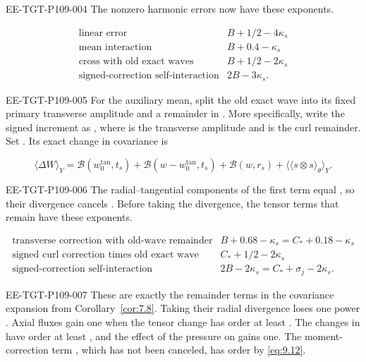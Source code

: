 \begin{EESegment}{EE-TGT-P109-004}
The nonzero harmonic errors now have these exponents.
\end{EESegment}
\[
\begin{array}{r|l}
\text{linear error} & B+1/2-4\kappa_s\\
\text{mean interaction} & B+0.4-\kappa_s\\
\text{cross with old exact waves} & B+1/2-2\kappa_s\\
\text{signed-correction self-interaction} & 2B-3\kappa_s.
\end{array}
\]
\begin{EESegment}{EE-TGT-P109-005}
For the auxiliary mean, split the old exact wave into its fixed primary transverse amplitude and a
remainder in . More specifically, write the signed increment
as , where  is the transverse amplitude
and  is the curl remainder. Set
.
Its exact change in covariance is
\end{EESegment}
\begin{equation}
\langle\Delta W\rangle_Y
=\mathscr B(w_0^{\tan},t_s)+\mathscr B(w-w_0^{\tan},t_s)
 +\mathscr B(w,r_s)+\langle\langle s\otimes s\rangle_\theta\rangle_Y.
\tag{9.13}\label{eq:9.13}
\end{equation}
\begin{EESegment}{EE-TGT-P109-006}
The radial--tangential components of the first term equal
, so their divergence cancels
. Before taking the divergence, the tensor terms that remain have
these exponents.
\end{EESegment}
\[
\begin{array}{r|l}
\text{transverse correction with old-wave remainder}
  & B+0.68-\kappa_s=C_*+0.18-\kappa_s\\
\text{signed curl correction times old exact wave}
  & C_*+1/2-2\kappa_s\\
\text{signed-correction self-interaction}
  & 2B-2\kappa_s=C_*+\sigma_j-2\kappa_s.
\end{array}
\]
\begin{EESegment}{EE-TGT-P109-007}
These are exactly the remainder terms in the covariance expansion from
Corollary~\ref{cor:7.8}. Taking their radial divergence loses one power
. Axial fluxes gain one when the tensor change has order at least
. The changes in
 have order at least
, and the effect of the pressure on
 gains one. The moment-correction term
, which has not been canceled, has order
 by \eqref{eq:9.12}.
\end{EESegment}
